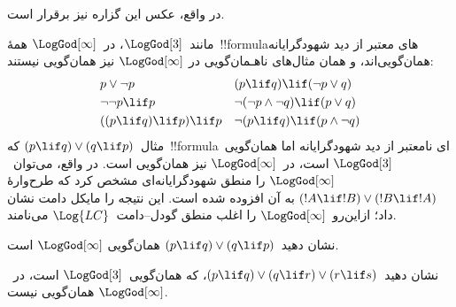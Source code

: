 \documentclass[../../../include/open-logic-section]{subfiles}
\begin{document}
در واقع، عکس این گزاره نیز برقرار است.

مانند~$\LogGod[3]$، در~$\LogGod[\infty]$ همهٔ~!!{formula}های معتبر از
دید شهودگرایانه همان‌گویی‌اند، و همان مثال‌های ناهـمان‌گویی در
$\LogGod[\infty]$ نیز همان‌گویی نیستند:
\begin{align*}
  & p \lor \lnot p && (p \lif q) \lif (\lnot p \lor q) \\
  & \lnot\lnot p \lif p && \lnot(\lnot p \land \lnot q) \lif (p \lor q) \\
  & ((p \lif q) \lif p) \lif p && \lnot(p \lif q) \lif (p \land \lnot q)
\end{align*}
مثال~$(p \lif q) \lor (q \lif p)$ که~!!{formula}ای نامعتبر از دید
شهودگرایانه اما همان‌گویی~$\LogGod[3]$ است، در~$\LogGod[\infty]$ نیز
همان‌گویی است. در واقع، می‌توان~$\LogGod[\infty]$ را منطق
شهودگرایانه‌ای مشخص کرد که طرح‌وارهٔ
$(!A \lif !B) \lor (!B \lif !A)$ به آن افزوده شده است. این نتیجه را
مایکل دامت نشان داد؛ ازاین‌رو~$\LogGod[\infty]$ را اغلب منطق
گودل--دامت~$\Log{LC}$ می‌نامند.

\begin{prob}
  نشان دهید~$(p \lif q) \lor (q \lif p)$ همان‌گویی
  $\LogGod[\infty]$ است.
\end{prob}

\begin{prob}
  نشان دهید~$(p \lif q) \lor (q \lif r) \lor (r \lif s)$، که
  همان‌گویی~$\LogGod[3]$ است، در~$\LogGod[\infty]$ همان‌گویی نیست.
\end{prob}
\end{document}

